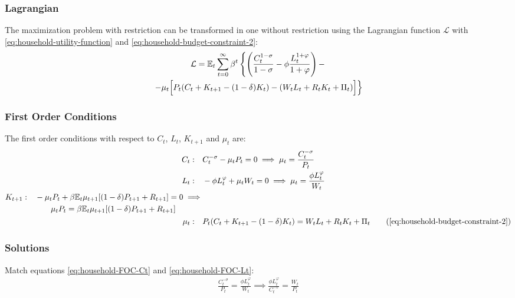 \documentclass[
	thesis.tex
	]{subfiles}
\begin{document}
\subsubsection*{Lagrangian}

The maximization problem with restriction can be transformed in one without restriction using the Lagrangian function $\mathcal{L}$ with \ref{eq:household-utility-function} and \ref{eq:household-budget-constraint-2}:
\begin{multline}
	\label{eq:household-lagrangian}
	\mathcal{L} = \mathbb{E}_t \sum_{t=0}^{\infty} \beta^t 
	\left\{ \left( \frac{C_t^{1-\sigma}}{1-\sigma} - \phi \frac{L_t^{1+\varphi}}{1+\varphi} \right) - \right.
	\\
	\left. -\mu_t \Bigr[ P_t (C_t + K_{t+1} - (1-\delta) K_t) - (W_t L_t + R_t K_t + \Pi_t) \Bigl] \right\}
\end{multline}

\subsubsection*{First Order Conditions}

The first order conditions with respect to $C_t$, $L_t$, $K_{t+1}$ and $\mu_t$ are:
\begin{align}
	C_t: \quad & C_t^{-\sigma} -\mu_t P_t = 0 \implies \mu_t = \frac{C_t^{-\sigma}}{P_t} \label{eq:household-FOC-Ct} \\
	L_t: \quad & -\phi L_t^{\varphi} +\mu_t W_t = 0 \implies \mu_t = \frac{\phi L_t^{\varphi}}{W_t} \label{eq:household-FOC-Lt} \\
	\begin{split}
		K_{t+1}: \quad & -\mu_t P_t +\beta \mathbb{E}_t \mu_{t+1} [(1-\delta) P_{t+1} + R_{t+1}] = 0 \implies \\ & \qquad \mu_t P_t = \beta \mathbb{E}_t \mu_{t+1} [(1-\delta) P_{t+1} + R_{t+1}]
	\end{split} \label{eq:household-FOC-Kt} \\
	\mu_t: \quad & P_t (C_t + K_{t+1} - (1-\delta)K_t) = W_t L_t + R_t K_t + \Pi_t \tag{\ref{eq:household-budget-constraint-2}}
\end{align}

\subsubsection*{Solutions}

Match equations \ref{eq:household-FOC-Ct} and \ref{eq:household-FOC-Lt}:
\begin{align}
	\label{eq:household-labor-supply}
	\frac{C_t^{-\sigma}}{P_t} = \frac{\phi L_t^{\varphi}}{W_t} \implies 
	\frac{\phi L_t^{\varphi}}{C_t^{-\sigma}} = \frac{W_t}{P_t}
\end{align}
\end{document}
